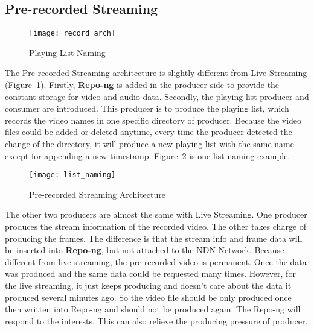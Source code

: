 \subsection{Pre-recorded Streaming}
\begin{figure}%
  \centering
  \texttt{[image: record\_arch]}
  \caption{Playing List Naming}
  \label{fig:record_arch}
\end{figure}

The Pre-recorded Streaming architecture is slightly different from Live Streaming (Figure~\ref{fig:record_arch}). Firstly, \textbf{Repo-ng} is added in the producer side to provide the constant storage for video and audio data. Secondly, the playing list producer and consumer are introduced. This producer is to produce the playing list, which records the video names in one specific directory of producer. Because the video files could be added or deleted anytime, every time the producer detected the change of the directory, it will produce a new playing list with the same name except for appending a new timestamp. Figure~\ref{fig:list_naming} is one list naming example. 

\begin{figure}%
  \centering
  \texttt{[image: list\_naming]}
  \caption{Pre-recorded Streaming Architecture}
  \label{fig:list_naming}
\end{figure}

The other two producers are almost the same with Live Streaming. One producer produces the stream information of the recorded video. The other takes charge of producing the frames. The difference is that the stream info and frame data will be inserted into \textbf{Repo-ng}, but not attached to the NDN Network. Because different from live streaming, the pre-recorded video is permanent. Once the data was produced and the same data could be requested many times. However, for the live streaming, it just keeps producing and doesn't care about the data it produced several minutes ago. So the video file should be only produced once then written into Repo-ng and should not be produced again. The Repo-ng will respond to the interests. This can also relieve the producing pressure of producer.  

